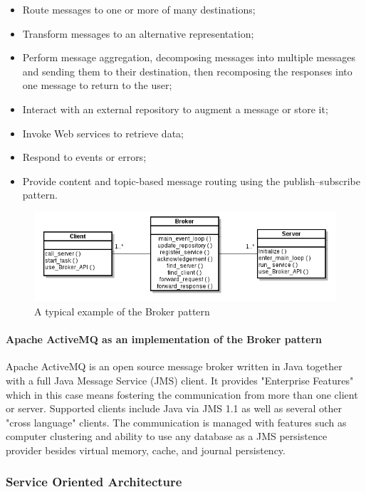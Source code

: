 \begin{itemize}
\item Route messages to one or more of many destinations;
\item Transform messages to an alternative representation;
\item Perform message aggregation, decomposing messages into multiple messages and sending them to their destination, then recomposing the responses into one message to return to the user;
\item Interact with an external repository to augment a message or store it;
\item Invoke Web services to retrieve data;
\item Respond to events or errors;
\item Provide content and topic-based message routing using the publish–subscribe pattern.
\end{itemize}

\begin{figure}
\centering
\includegraphics[width=1\textwidth]{../images/broker.png}
\caption{\label{fig:frog} A typical example of the Broker pattern}
\end{figure}

\paragraph{Apache ActiveMQ as an implementation of the Broker pattern}

Apache ActiveMQ is an open source message broker written in Java together with a full Java Message Service (JMS) client. It provides "Enterprise Features" which in this case means fostering the communication from more than one client or server. Supported clients include Java via JMS 1.1 as well as several other "cross language" clients. The communication is managed with features such as computer clustering and ability to use any database as a JMS persistence provider besides virtual memory, cache, and journal persistency.

\subsubsection{Service Oriented Architecture}


